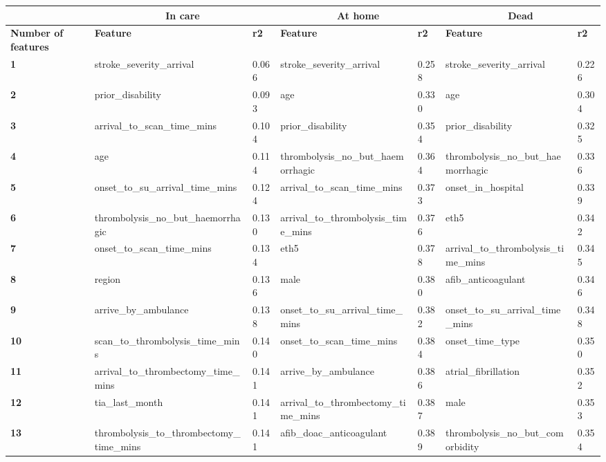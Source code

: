 \begin{landscape}

\begin{table}[!ht]
    \small
    \centering
    \begin{tabular}{|l|l|l|l|l|l|l|}
    \hline
        ~ & \multicolumn{2}{|c|}{\bf In care} & \multicolumn{2}{|c|}{\bf At home} & \multicolumn{2}{|c|}{\bf Dead}\\ \hline
        \bf Number of features & \bf Feature & \bf r2 & \bf Feature & \bf r2 & \bf Feature & \bf r2  \\ \hline
        \bf 1 & stroke\_severity\_arrival & 0.066 & stroke\_severity\_arrival & 0.258 & stroke\_severity\_arrival & 0.226 \\ \hline
        \bf 2 & prior\_disability & 0.093 & age & 0.330 & age & 0.304 \\ \hline
        \bf 3 & arrival\_to\_scan\_time\_mins & 0.104 & prior\_disability & 0.354 & prior\_disability & 0.325 \\ \hline
        \bf 4 & age & 0.114 & thrombolysis\_no\_but\_haemorrhagic & 0.364 & thrombolysis\_no\_but\_haemorrhagic & 0.336 \\ \hline
        \bf 5 & onset\_to\_su\_arrival\_time\_mins & 0.124 & arrival\_to\_scan\_time\_mins & 0.373 & onset\_in\_hospital & 0.339 \\ \hline
        \bf 6 & thrombolysis\_no\_but\_haemorrhagic & 0.130 & arrival\_to\_thrombolysis\_time\_mins & 0.376 & eth5 & 0.342 \\ \hline
        \bf 7 & onset\_to\_scan\_time\_mins & 0.134 & eth5 & 0.378 & arrival\_to\_thrombolysis\_time\_mins & 0.345 \\ \hline
        \bf 8 & region & 0.136 & male & 0.380 & afib\_anticoagulant & 0.346 \\ \hline
        \bf 9 & arrive\_by\_ambulance & 0.138 & onset\_to\_su\_arrival\_time\_mins & 0.382 & onset\_to\_su\_arrival\_time\_mins & 0.348 \\ \hline
        \bf 10 & scan\_to\_thrombolysis\_time\_mins & 0.140 & onset\_to\_scan\_time\_mins & 0.384 & onset\_time\_type & 0.350 \\ \hline
        \bf 11 & arrival\_to\_thrombectomy\_time\_mins & 0.141 & arrive\_by\_ambulance & 0.386 & atrial\_fibrillation & 0.352 \\ \hline
        \bf 12 & tia\_last\_month & 0.141 & arrival\_to\_thrombectomy\_time\_mins & 0.387 & male & 0.353 \\ \hline
        \bf 13 & thrombolysis\_to\_thrombectomy\_time\_mins & 0.141 & afib\_doac\_anticoagulant & 0.389 & thrombolysis\_no\_but\_comorbidity & 0.354 \\ \hline

\end{tabular}
\end{table}
\end{landscape}
